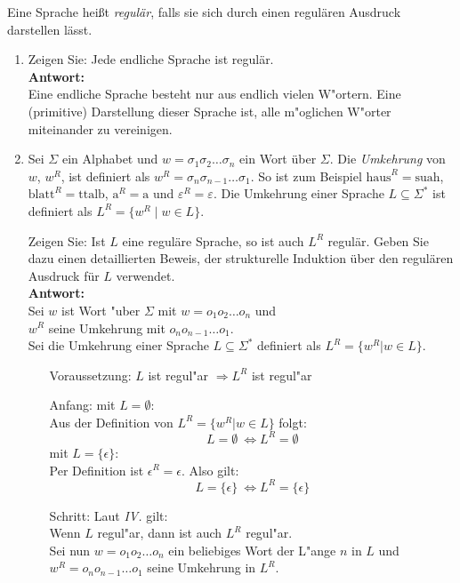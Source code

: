 \documentclass[a4paper,twoside,12pt,fleqn]{article}
\begin{document}
\begin{description}
	Eine Sprache hei\ss{}t \emph{regul\"ar}, falls sie sich durch einen
	regul\"aren Ausdruck darstellen l\"asst.

	\begin{enumerate}
	\item Zeigen Sie: Jede endliche Sprache ist regul\"ar.\\
	\textbf{Antwort: }\\
	Eine endliche Sprache besteht nur aus endlich vielen W"ortern.
	Eine (primitive) Darstellung dieser Sprache ist, alle m"oglichen
	W"orter miteinander zu vereinigen.
	\item
	Sei $\Sigma$ ein Alphabet und $w = \sigma_1\sigma_2\dots\sigma_n$
	ein Wort \"uber $\Sigma$. Die \emph{Umkehrung} von $w$, $w^R$, ist
	definiert als $w^R = \sigma_{n}\sigma_{n-1}\dots\sigma_1$.
	So ist zum Beispiel $\text{haus}^{R}=\text{suah}$,
	$\text{blatt}^{R}=\text{ttalb}$,
	$\text{a}^{R}=\text{a}$ und
	$\varepsilon^{R}=\varepsilon$.
	Die Umkehrung einer Sprache $L \subseteq \Sigma^*$
	ist definiert als
	$L^R = \{w^R \mid w \in L\}$.

	Zeigen Sie: Ist $L$ eine regul\"are Sprache, so ist auch
	$L^R$ regul\"ar. Geben Sie dazu einen detaillierten Beweis,
	der strukturelle Induktion \"uber den regul\"aren Ausdruck
	f\"ur $L$ verwendet.\\
	\textbf{Antwort: }\\
	Sei $w$ ist Wort "uber $\Sigma$ mit $w = o_1o_2\dots o_n$ und\\
	$w^R$ seine Umkehrung mit $o_no_{n-1}\dots o_1$.\\
	Sei die Umkehrung einer Sprache $L \subseteq \Sigma^*$ definiert als
	$L^R = \{w^R | w \in L\}$.\\
	\begin{enumerate}
		\item[Voraussetzung:] $L$ ist regul"ar $\Rightarrow L^R$ ist regul"ar
		\item[Anfang:]
			mit $L = \emptyset$:\\
			Aus der Definition von $L^R = \{w^R | w \in L\}$ folgt:
			\[ L = \emptyset \> \Leftrightarrow L^R = \emptyset \]
			mit $L = \{\epsilon\}$:\\
			Per Definition ist $\epsilon^R = \epsilon$. Also gilt:
			\[ L = \{\epsilon\} \> \Leftrightarrow L^R = \{\epsilon\} \]
		\item[Schritt:] Laut \emph{IV.} gilt:\\
			Wenn $L$ regul"ar, dann ist auch $L^R$ regul"ar.\\
			Sei nun $w = o_1o_2\dots o_n$ ein beliebiges
			Wort der L"ange $n$ in $L$ und\\
			$w^R = o_no_{n-1}\dots o_1$
			seine Umkehrung in $L^R$.


\end{enumerate}
\end{enumerate}
\end{description}
\end{document}
